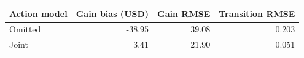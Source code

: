 \begin{tabular}{@{}lrrr@{}}
\toprule
Action model & Gain bias (USD) & Gain RMSE & Transition RMSE\\
\midrule
Omitted & -38.95 & 39.08 & 0.203\\
Joint & 3.41 & 21.90 & 0.051\\
\bottomrule
\end{tabular}
